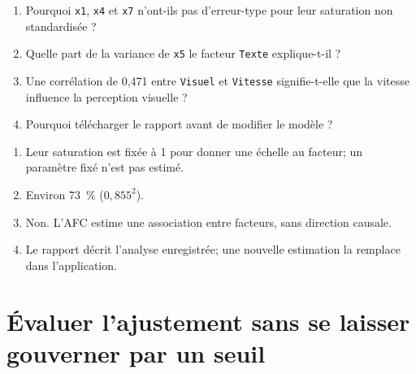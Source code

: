 \documentclass[
  french,
  11pt,
  a4paper,
  DIV=11,
  numbers=noendperiod]{scrreprt}
\providecommand{\tightlist}{%
  \setlength{\itemsep}{0pt}\setlength{\parskip}{0pt}}
\begin{document}
\begin{enumerate}
\def\labelenumi{\arabic{enumi}.}
\tightlist
\item
  Pourquoi \texttt{x1}, \texttt{x4} et \texttt{x7} n'ont-ils pas
  d'erreur-type pour leur saturation non standardisée ?
\item
  Quelle part de la variance de \texttt{x5} le facteur \texttt{Texte}
  explique-t-il ?
\item
  Une corrélation de 0,471 entre \texttt{Visuel} et \texttt{Vitesse}
  signifie-t-elle que la vitesse influence la perception visuelle ?
\item
  Pourquoi télécharger le rapport avant de modifier le modèle ?
\end{enumerate}

\begin{tcolorbox}[enhanced jigsaw, arc=.35mm, bottomrule=.15mm, bottomtitle=1mm, breakable, colback=white, colbacktitle=quarto-callout-tip-color!10!white, colframe=quarto-callout-tip-color-frame, coltitle=black, left=2mm, leftrule=.75mm, opacityback=0, opacitybacktitle=0.6, rightrule=.15mm, title={Réponses}, titlerule=0mm, toprule=.15mm, toptitle=1mm]

\begin{enumerate}
\def\labelenumi{\arabic{enumi}.}
\tightlist
\item
  Leur saturation est fixée à 1 pour donner une échelle au facteur; un
  paramètre fixé n'est pas estimé.
\item
  Environ 73~\% (\(0{,}855^2\)).
\item
  Non. L'AFC estime une association entre facteurs, sans direction
  causale.
\item
  Le rapport décrit l'analyse enregistrée; une nouvelle estimation la
  remplace dans l'application.
\end{enumerate}

\end{tcolorbox}


\chapter{Évaluer l'ajustement sans se laisser gouverner par un
seuil}\label{sec-ajustement}
\end{document}
